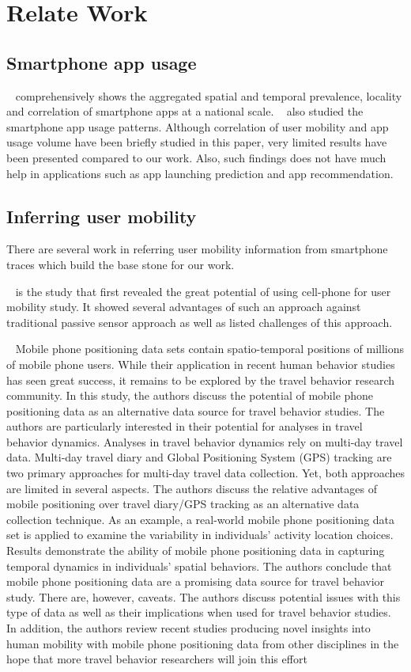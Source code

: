 \section{Relate Work}

\subsection {Smartphone app usage}
~\cite{xu2011identifying} comprehensively shows the aggregated spatial and temporal prevalence, locality and correlation of smartphone apps at a national scale. ~\cite{yang2015characterizing} also studied the smartphone app usage patterns. Although correlation of user mobility and app usage volume have been briefly studied in this paper, very limited results have been presented compared to our work. Also, such findings does not have much help in applications such as app launching prediction and app recommendation.

\subsection{Inferring user mobility}
There are several work in referring user mobility information from smartphone traces which build the base stone for our work.

~\cite{rose2006mobile} is the study that first revealed the great potential of using cell-phone for user mobility study. It showed several advantages of such an approach against traditional passive sensor approach as well as listed challenges of this approach.

~\cite{wang2014mobile}
Mobile phone positioning data sets contain spatio-temporal positions of millions of mobile phone users. While their application in recent human behavior studies has seen great success, it remains to be explored by the travel behavior research community. In this study, the authors discuss the potential of mobile phone positioning data as an alternative data source for travel behavior studies. The authors are particularly interested in their potential for analyses in travel behavior dynamics. Analyses in travel behavior dynamics rely on multi-day travel data. Multi-day travel diary and Global Positioning System (GPS) tracking are two primary approaches for multi-day travel data collection. Yet, both approaches are limited in several aspects. The authors discuss the relative advantages of mobile positioning over travel diary/GPS tracking as an alternative data collection technique. As an example, a real-world mobile phone positioning data set is applied to examine the variability in individuals’ activity location choices. Results demonstrate the ability of mobile phone positioning data in capturing temporal dynamics in individuals’ spatial behaviors. The authors conclude that mobile phone positioning data are a promising data source for travel behavior study. There are, however, caveats. The authors discuss potential issues with this type of data as well as their implications when used for travel behavior studies. In addition, the authors review recent studies producing novel insights into human mobility with mobile phone positioning data from other disciplines in the hope that more travel behavior researchers will join this effort

